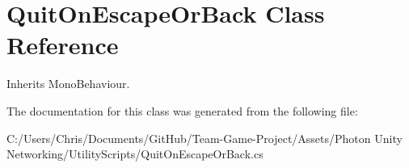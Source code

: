 \hypertarget{class_quit_on_escape_or_back}{}\section{Quit\+On\+Escape\+Or\+Back Class Reference}
\label{class_quit_on_escape_or_back}


Inherits Mono\+Behaviour.



The documentation for this class was generated from the following file\+:\begin{DoxyCompactItemize}
\item 
C\+:/\+Users/\+Chris/\+Documents/\+Git\+Hub/\+Team-\/\+Game-\/\+Project/\+Assets/\+Photon Unity Networking/\+Utility\+Scripts/Quit\+On\+Escape\+Or\+Back.\+cs\end{DoxyCompactItemize}
